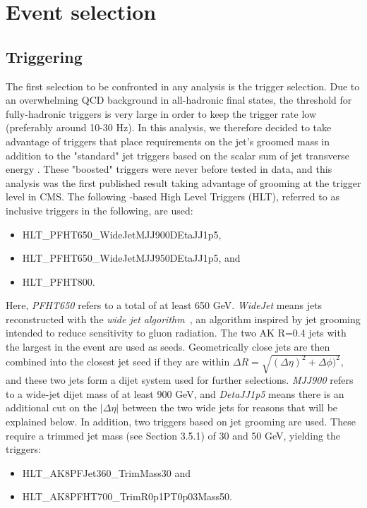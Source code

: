 \section{Event selection}

\subsection{Triggering}
\label{sec:searchI:trigger}
The first selection to be confronted in any analysis is the trigger selection. Due to an overwhelming QCD background in all-hadronic final states, the threshold for fully-hadronic triggers is very large in order to keep the trigger rate low (preferably around 10-30 Hz). In this analysis, we therefore decided to take advantage of triggers that place requirements on the jet's groomed mass in addition to the "standard" jet triggers based on the scalar sum of jet transverse energy \HT. These "boosted" triggers were never before tested in data, and this analysis was the first published result taking advantage of grooming at the trigger level in CMS. The following \HT-based High Level Triggers (HLT), referred to as inclusive triggers in the following, are used:
\begin{itemize}
  \itemsep0em 
\item {HLT\_PFHT650\_WideJetMJJ900DEtaJJ1p5},
\item {HLT\_PFHT650\_WideJetMJJ950DEtaJJ1p5}, and
\item {HLT\_PFHT800}.
\end{itemize}
Here, \emph{PFHT650} refers to a total \HT of at least 650 GeV. \emph{WideJet} means jets reconstructed with the \emph{wide jet algorithm}~\cite{2011123}, an algorithm inspired by jet grooming intended to reduce sensitivity to gluon radiation. The two AK R=0.4 jets with the largest \PT in the event are used as seeds. Geometrically close jets are then combined into the closest jet seed if they are within $\Delta R = \sqrt{(\Delta \eta)^2+\Delta \phi)^2}$, and these two jets form a dijet system used for further selections. \emph{MJJ900} refers to a wide-jet dijet mass of at least 900 GeV, and \emph{DetaJJ1p5} means there is an additional cut on the $|\Delta \eta|$ between the two wide jets for reasons that will be explained below. In addition, two triggers based on jet grooming are used. These require a trimmed jet mass (see Section 3.5.1) of 30 and 50 GeV, yielding the triggers:
\begin{itemize}
  \itemsep0em 
\item {HLT\_AK8PFJet360\_TrimMass30} and
\item {HLT\_AK8PFHT700\_TrimR0p1PT0p03Mass50}.
\end{itemize}
